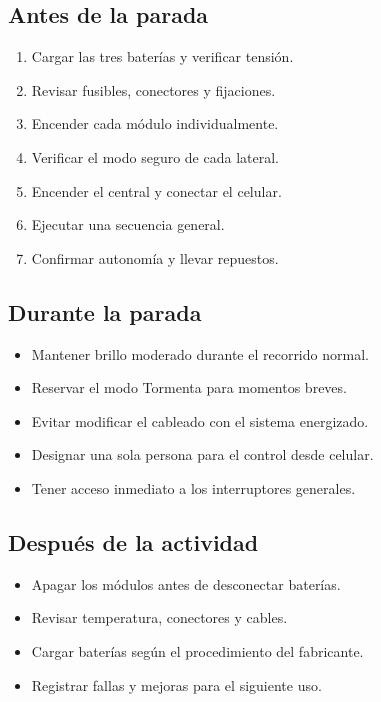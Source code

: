 \documentclass[11pt,a4paper]{article}
\begin{document}
\subsection{Antes de la parada}
\begin{enumerate}
  \item Cargar las tres baterías y verificar tensión.
  \item Revisar fusibles, conectores y fijaciones.
  \item Encender cada módulo individualmente.
  \item Verificar el modo seguro de cada lateral.
  \item Encender el central y conectar el celular.
  \item Ejecutar una secuencia general.
  \item Confirmar autonomía y llevar repuestos.
\end{enumerate}

\subsection{Durante la parada}
\begin{itemize}
  \item Mantener brillo moderado durante el recorrido normal.
  \item Reservar el modo Tormenta para momentos breves.
  \item Evitar modificar el cableado con el sistema energizado.
  \item Designar una sola persona para el control desde celular.
  \item Tener acceso inmediato a los interruptores generales.
\end{itemize}

\subsection{Después de la actividad}
\begin{itemize}
  \item Apagar los módulos antes de desconectar baterías.
  \item Revisar temperatura, conectores y cables.
  \item Cargar baterías según el procedimiento del fabricante.
  \item Registrar fallas y mejoras para el siguiente uso.
\end{itemize}

\end{document}
